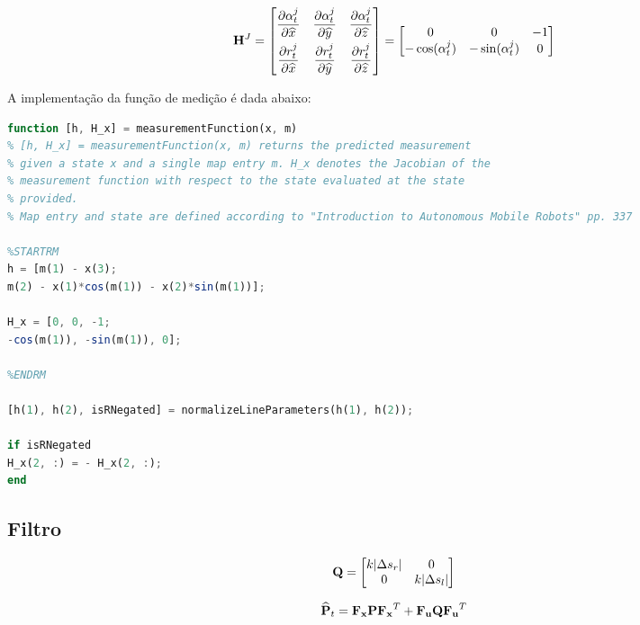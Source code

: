 \begin{equation}\label{eq:H}
	\mathbf{H}^J = \begin{bmatrix}
		\dfrac{\partial \alpha_t^j}{\partial \widehat{x}} & \dfrac{\partial \alpha_t^j}{\partial \widehat{y}} & \dfrac{\partial \alpha_t^j}{\partial \widehat{z}} \\[2ex]
		\dfrac{\partial r_t^j}{\partial \widehat{x}} & \dfrac{\partial r_t^j}{\partial \widehat{y}} & \dfrac{\partial r_t^j}{\partial \widehat{z}}
	\end{bmatrix} = \begin{bmatrix}
		0 & 0 & -1 \\
		-\cos(\alpha_t^j) & -\sin(\alpha_t^j) & 0
	\end{bmatrix}
\end{equation}

A implementação da função de medição é dada abaixo:

\begin{lstlisting}[language=Octave]
function [h, H_x] = measurementFunction(x, m)
% [h, H_x] = measurementFunction(x, m) returns the predicted measurement
% given a state x and a single map entry m. H_x denotes the Jacobian of the
% measurement function with respect to the state evaluated at the state
% provided.
% Map entry and state are defined according to "Introduction to Autonomous Mobile Robots" pp. 337

%STARTRM
h = [m(1) - x(3);
m(2) - x(1)*cos(m(1)) - x(2)*sin(m(1))];

H_x = [0, 0, -1;
-cos(m(1)), -sin(m(1)), 0];

%ENDRM

[h(1), h(2), isRNegated] = normalizeLineParameters(h(1), h(2));

if isRNegated 
H_x(2, :) = - H_x(2, :);
end
\end{lstlisting}

\clearpage


\subsection{Filtro}

\begin{equation}\label{eq:Q}
	\mathbf{Q} = \begin{bmatrix}
		k|\Delta s_r| & 0 \\
		0 & k|\Delta s_l|
	\end{bmatrix}
\end{equation}

\begin{equation}\label{eq:Ppriori}
	\widehat{\mathbf{P}}_t = \mathbf{F_x}\mathbf{P}\mathbf{F_x}^T + \mathbf{F_u}\mathbf{Q}\mathbf{F_u}^T 
\end{equation}

